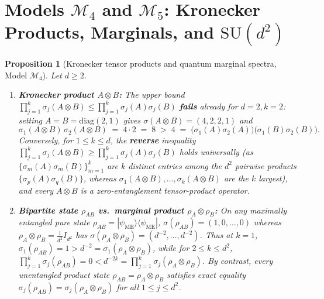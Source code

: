 \documentclass[11pt,a4paper]{article}
\theoremstyle{plain}
\newtheorem{proposition}[theorem]{Proposition}
\theoremstyle{definition}
\newcommand{\diag}{\mathrm{diag}}
\newcommand{\SU}{\mathrm{SU}}
\begin{document}
\section{Models \texorpdfstring{$\mathcal{M}_4$}{M4} and \texorpdfstring{$\mathcal{M}_5$}{M5}: Kronecker Products, Marginals, and \texorpdfstring{$\SU(d^2)$}{SU(d2)}}

\begin{proposition}[Kronecker tensor products and quantum marginal spectra, Model $\mathcal{M}_4$]
\label{prop:m4}
Let $d \ge 2$.
\begin{enumerate}
  \item \textbf{Kronecker product $A \otimes B$:} The upper bound $\prod_{j=1}^k \sigma_j(A \otimes B) \le \prod_{j=1}^k \sigma_j(A)\sigma_j(B)$ \textbf{fails} already for $d = 2, k = 2$: setting $A = B = \diag(2,1)$ gives $\sigma(A \otimes B) = (4,2,2,1)$ and
  \[
    \sigma_1(A \otimes B)\,\sigma_2(A \otimes B) \;=\; 4 \cdot 2 \;=\; 8 \;>\; 4 \;=\; \bigl(\sigma_1(A)\sigma_2(A)\bigr)\bigl(\sigma_1(B)\sigma_2(B)\bigr).
  \]
  Conversely, for $1 \le k \le d$, the \textbf{reverse} inequality $\prod_{j=1}^k \sigma_j(A \otimes B) \ge \prod_{j=1}^k \sigma_j(A)\sigma_j(B)$ holds universally (as $\{\sigma_m(A)\sigma_m(B)\}_{m=1}^k$ are $k$ distinct entries among the $d^2$ pairwise products $\{\sigma_p(A)\sigma_q(B)\}$, whereas $\sigma_1(A \otimes B), \dots, \sigma_k(A \otimes B)$ are the $k$ largest), and every $A \otimes B$ is a zero-entanglement tensor-product operator.
  \item \textbf{Bipartite state $\rho_{AB}$ vs.\ marginal product $\rho_A \otimes \rho_B$:} On any maximally entangled pure state $\rho_{AB} = |\psi_{\mathrm{ME}}\rangle\langle\psi_{\mathrm{ME}}|$, $\sigma(\rho_{AB}) = (1, 0, \dots, 0)$ whereas $\rho_A \otimes \rho_B = \frac{1}{d^2} I_{d^2}$ has $\sigma(\rho_A \otimes \rho_B) = (d^{-2}, \dots, d^{-2})$. Thus at $k = 1$, $\sigma_1(\rho_{AB}) = 1 > d^{-2} = \sigma_1(\rho_A \otimes \rho_B)$, while for $2 \le k \le d^2$, $\prod_{j=1}^k \sigma_j(\rho_{AB}) = 0 < d^{-2k} = \prod_{j=1}^k \sigma_j(\rho_A \otimes \rho_B)$. By contrast, \emph{every} unentangled product state $\rho_{AB} = \rho_A \otimes \rho_B$ satisfies exact equality $\sigma_j(\rho_{AB}) = \sigma_j(\rho_A \otimes \rho_B)$ for all $1 \le j \le d^2$.
\end{enumerate}
\end{proposition}
\end{document}
